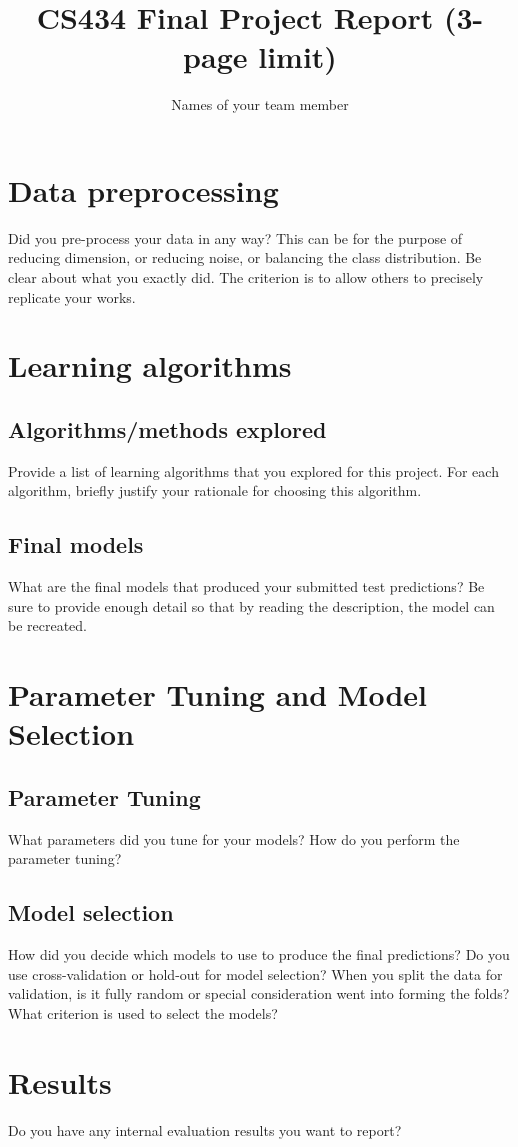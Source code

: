 \documentclass[10pt,a4paper]{article}
\title{CS434 Final Project Report (3-page limit)}
\author{Names of your team member}
\date{}
\begin{document}
\maketitle
\section{Data preprocessing}
Did you pre-process your data in any way? This can be for the purpose of reducing dimension, or reducing noise, or balancing the class distribution. Be clear about what you exactly did. The criterion is to allow others to precisely replicate your works.

\section{Learning algorithms}
\subsection{Algorithms/methods explored}
Provide a list of learning algorithms that you explored for this project. For each algorithm, briefly justify your rationale for choosing this algorithm.
\subsection{Final models}
What are the final models that produced your submitted test predictions? Be sure to provide enough detail so that by reading the description, the model can be recreated.

\section{Parameter Tuning and Model Selection }
\subsection{Parameter Tuning}
What parameters did you tune for your models? How do you perform the parameter tuning?

\subsection{Model selection}
How did you decide which models to use to produce the final predictions?  Do you use cross-validation or hold-out for model selection? When you split the data for validation, is it fully random or special consideration went into forming the folds? What criterion is used to select the models?

\section{Results}
Do you have any internal evaluation results you want to report?
\end{document}
